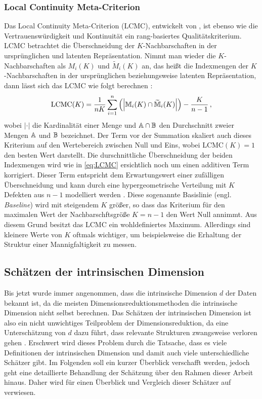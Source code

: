 \subsubsection{Local Continuity Meta-Criterion}
\label{ch:Vergleich:sec:Methodik:subsec:Qualitaetskriterien:LCMC}
Das Local Continuity Meta-Criterion (LCMC), entwickelt von \textcite{Chen.2009}, ist ebenso wie die Vertrauenswürdigkeit und Kontinuität ein rang-basiertes Qualitätskriterium. LCMC betrachtet die Überschneidung der $K$-Nachbarschaften in der ursprünglichen und latenten Repräsentation. Nimmt man wieder die $K$-Nachbarschaften als $M_i(K)$ und $\widetilde{M}_i(K)$ an, das heißt die Indexmengen der $K$-Nachbarschaften in der ursprünglichen beziehungsweise latenten Repräsentation, dann lässt sich das LCMC wie folgt berechnen \parencite[212]{Chen.2009}:
\begin{equation}
	\label{eq:LCMC}
	\text{LCMC}(K) = \frac{1}{nK} \sum_{i=1}^{n} \left( \left| \mathbb{M}_i(K) \cap \widetilde{\mathbb{M}}_i(K) \right| \right) - \frac{K}{n - 1} \,,
\end{equation}
wobei $­|\cdot|$ die Kardinalität einer Menge und $\mathbb{A} \cap \mathbb{B}$ den Durchschnitt zweier Mengen $\mathbb{A}$ und $\mathbb{B}$ bezeichnet. Der Term vor der Summation skaliert auch dieses Kriterium auf den Wertebereich zwischen Null und Eins, wobei LCMC$(K) = 1$ den besten Wert darstellt. Die durschnittliche Überschneidung der beiden Indexmengen wird wie in \eqref{eq:LCMC} ersichtlich noch um einen additiven Term korrigiert. Dieser Term entspricht dem Erwartungswert einer zufälligen Überschneidung und kann durch eine hypergeometrische Verteilung mit $K$ Defekten aus $n - 1$ modelliert werden \parencite[213]{Chen.2009}. Diese sogenannte Basislinie (engl. \textit{Baseline}) wird mit steigendem
$K$ größer, so dass das Kriterium für den maximalen Wert der Nachbarschftsgröße $K = n - 1$ den
Wert Null annimmt. Aus diesem Grund besitzt das LCMC ein wohldefiniertes Maximum. Allerdings sind
kleinere Werte von $K$ oftmals wichtiger, um beispielsweise die Erhaltung der Struktur einer
Mannigfaltigkeit zu messen.

\subsection{Schätzen der intrinsischen Dimension}
\label{ch:Vergleich:sec:Methodik:subsec:SchaetzenDerIntrinsischenDim}

Bis jetzt wurde immer angenommen, dass die intrinsische Dimension $d$ der Daten bekannt ist, da die
meisten Dimensionsreduktionsmethoden die intrinsische Dimension nicht selbst berechnen. Das
Schätzen der intrinsischen Dimension ist also ein nicht unwichtiges Teilproblem der
Dimensionsreduktion, da eine Unterschätzung von $d$ dazu führt, dass relevante Strukturen
zwangsweise verloren gehen \parencite[1]{Levina.2004}. Erschwert wird dieses Problem durch die Tatsache, dass es viele
Definitionen der intrinsischen Dimension und damit auch viele unterschiedliche Schätzer gibt. Im
Folgenden soll ein kurzer Überblick verschafft werden, jedoch geht eine detaillierte Behandlung der
Schätzung über den Rahmen dieser Arbeit hinaus. Daher wird für einen Überblick und Vergleich dieser
Schätzer auf \textcites{Campadelli.2015}{Bac.2021}{Verveer.1995} verwiesen.

